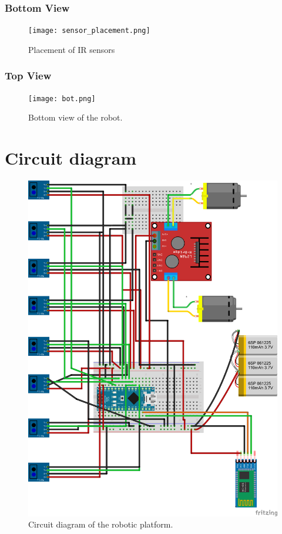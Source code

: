 \documentclass[14pt,a4paper]{extarticle}
\begin{document}
		\subsubsection{Bottom View}
			
			\begin{figure} [H]
				\texttt{[image: sensor\_placement.png]}
				\caption{Placement of IR sensors}
			\end{figure}
			
			\subsubsection{Top View}
			
			\begin{figure}[H]
				\texttt{[image: bot.png]}
				\caption{Bottom view of the robot.}
				\end{figure}
	
	\section{Circuit diagram}
	
		\begin{figure}[H]
			\includegraphics[left, scale = 0.8]{ckt_diagram.png}
			\caption{Circuit diagram of the robotic platform.}
		\end{figure}
	
\end{document}
